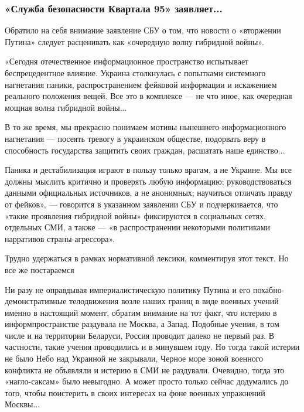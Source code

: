  
 
 
 
 

\subsubsection{«Служба безопасности Квартала 95» заявляет...}
\label{sec:17_02_2022.stz.news.ua.fraza.1.kak_zapadnyje_partnery_opuskajut_ukrainu.2.sluzhba_kvartal_95}

Обратило на себя внимание заявление СБУ о том, что новости о «вторжении Путина»
следует расценивать как «очередную волну гибридной войны».

«Сегодня отечественное информационное пространство испытывает беспрецедентное
влияние. Украина столкнулась с попытками системного нагнетания паники,
распространением фейковой информации и искажением реального положения вещей.
Все это в комплексе — не что иное, как очередная мощная волна гибридной
войны...

В то же время, мы прекрасно понимаем мотивы нынешнего информационного
нагнетания — посеять тревогу в украинском обществе, подорвать веру в
способность государства защитить своих граждан, расшатать наше единство...

Паника и дестабилизация играют в пользу только врагам, а не Украине. Мы все
должны мыслить критично и проверять любую информацию; руководствоваться данными
официальных источников, а не анонимных; научиться отличать правду от фейков», —
говорится в указанном заявлении СБУ и подчеркивается, что «такие проявления
гибридной войны» фиксируются в социальных сетях, отдельных СМИ, а также — «в
распространении некоторыми политиками нарративов страны-агрессора».

Трудно удержаться в рамках нормативной лексики, комментируя этот текст. Но все
же постараемся

Ни разу не оправдывая империалистическую политику Путина и его
похабно-демонстративные телодвижения возле наших границ в виде военных учений
именно в настоящий момент, обратим внимание на тот факт, что истерию в
информпространстве раздувала не Москва, а Запад. Подобные учения, в том числе и
на территории Беларуси, Россия проводит далеко не первый раз. В частности,
такие учения проводились и в минувшем году. Но тогда такой истерии не было Небо
над Украиной не закрывали, Черное море зоной военного конфликта не объявляли и
истерию в СМИ не раздували. Очевидно, тогда это «нагло-саксам» было невыгодно.
А может просто только сейчас додумались до того, чтобы поистерить в своих
интересах на фоне военных упражнений Москвы...

